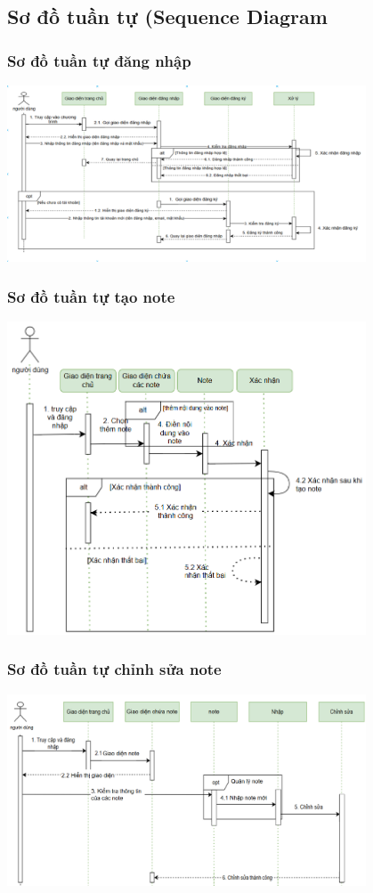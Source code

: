 \documentclass[a4paper,12pt]{article}
\begin{document}
\clearpage
\subsection{Sơ đồ tuần tự (Sequence Diagram}
\subsubsection{Sơ đồ tuần tự đăng nhập}
\includegraphics[width=0.8\textwidth]{SDdangnhap.png}
\subsubsection{Sơ đồ tuần tự tạo note}
\includegraphics[width=0.8\textwidth]{SDtaonote.png}

\clearpage

\subsubsection{Sơ đồ tuần tự chỉnh sửa note}
\includegraphics[width=0.8\textwidth]{SDsuanote.png}
\end{document}
